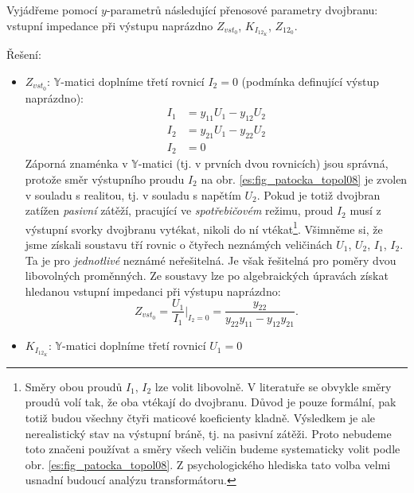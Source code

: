 \begin{example}\label{TEO:exam016}
  Vyjádřeme pomocí \(y\)-parametrů následující přenosové parametry dvojbranu: vstupní 
  impedance při výstupu naprázdno \(Z_{vst_0}\), \(K_{I_{12_K}}\), \(Z_{12_0}\). 
  
  Řešení:
  \begin{itemize}\addtolength{\itemsep}{-0.5\baselineskip}
    \item \(Z_{vst_0}\): \(\mathbb{Y}\)-matici doplníme třetí rovnicí \(I_2=0\) (podmínka 
    definující výstup naprázdno):
    \begin{subequations}\label{ES:eq_topol10}
      \begin{align}
        I_1 &= y_{11}U_1 - y_{12}U_2  \\
        I_2 &= y_{21}U_1 - y_{22}U_2  \\
        I_2 &= 0
      \end{align}
    \end{subequations}
    Záporná znaménka v \(\mathbb{Y}\)-matici (tj. v prvních dvou rovnicích) jsou 
    správná, protože směr výstupního proudu \(I_2\) na obr. 
    \ref{es:fig_patocka_topol08} je zvolen v souladu s realitou, tj. v souladu s 
    napětím \(U_2\). Pokud je totiž dvojbran zatížen \emph{pasivní} zátěží, pracující 
    ve \emph{spotřebičovém} režimu, proud \(I_2\) musí z výstupní svorky dvojbranu 
    vytékat, nikoli do ní vtékat\footnote{Směry obou proudů \(I_1\), \(I_2\) lze volit 
      libovolně. V literatuře se obvykle směry proudů volí tak, že oba vtékají do 
      dvojbranu. Důvod je pouze formální, pak totiž budou všechny čtyři maticové 
      koeficienty kladně. Výsledkem je ale nerealistický stav na výstupní bráně, tj. na 
      pasivní zátěži. Proto nebudeme toto značeni používat a směry všech veličin budeme 
      systematicky volit podle obr. \ref{es:fig_patocka_topol08}. Z psychologického 
      hlediska tato volba velmi usnadní budoucí analýzu transformátoru.}. Všimněme si, že 
    jsme získali soustavu tří rovnic o čtyřech neznámých veličinách \(U_1\), \(U_2\), 
    \(I_1\), \(I_2\). Ta je pro \emph{jednotlivé} neznámé neřešitelná. Je však 
    řešitelná pro poměry dvou libovolných proměnných. Ze soustavy lze po algebraických 
    úpravách získat hledanou vstupní impedanci při výstupu naprázdno:
    \begin{equation}\label{ES:eq_topol11}
    Z_{vst_0} = \frac{U_1}{I_1}\Bigg|_{I_2=0} 
    = \frac{y_{22}}{y_{22}y_{11} - y_{12}y_{21}}.
    \end{equation}
    \item \(K_{I_{12_K}}\): \(\mathbb{Y}\)-matici doplníme třetí rovnicí \(U_1 = 0\) 

\end{itemize}
\end{example}
